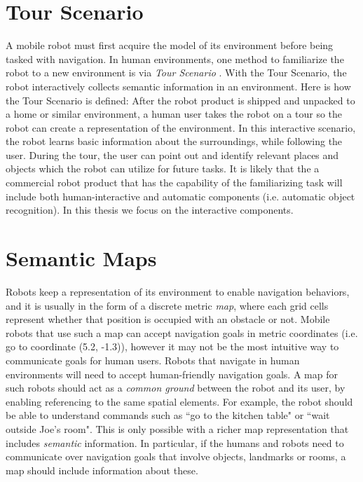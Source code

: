 \documentclass[12pt]{gatech-thesis}
\begin{document}
\section{Tour Scenario}
\label{sec:tour_scenario}

A mobile robot must first acquire the model of its environment before being tasked with navigation. In human environments, one method to familiarize the robot to a new environment is via \textit{Tour Scenario} \cite{topp2008human}. With the Tour Scenario, the robot interactively collects semantic information in an environment. Here is how the Tour Scenario is defined: After the robot product is shipped and unpacked to a home or similar environment, a human user takes the robot on a tour so the robot can create a representation of the environment. In this interactive scenario, the robot learns basic information about the surroundings, while following the user. During the tour, the user can point out and identify relevant places and objects which the robot can utilize for future tasks. It is likely that the a commercial robot product that has the capability of the familiarizing task will include both human-interactive and automatic components (i.e. automatic object recognition). In this thesis we focus on the interactive components.

\section{Semantic Maps}
\label{sec:semantic_maps}

Robots keep a representation of its environment to enable navigation behaviors, and it is usually in the form of a discrete metric \textit{map}, where each grid cells represent whether that position is occupied with an obstacle or not. Mobile robots that use such a map can accept navigation goals in metric coordinates (i.e. go to coordinate (5.2, -1.3)), however it may not be the most intuitive way to communicate goals for human users. Robots that navigate in human environments will need to accept human-friendly navigation goals. A map for such robots should act as a \textit{common ground} between the robot and its user, by enabling referencing to the same spatial elements. For example, the robot should be able to understand commands such as ``go to the kitchen table" or ``wait outside Joe's room". This is only possible with a richer map representation that includes \textit{semantic} information. In particular, if the humans and robots need to communicate over navigation goals that involve objects, landmarks or rooms, a map should include information about these.
\end{document}
